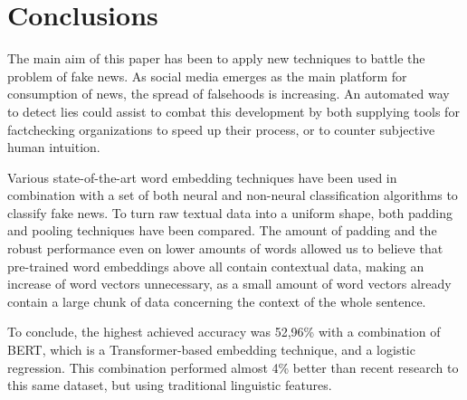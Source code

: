 \section{Conclusions}
The main aim of this paper has been to apply new techniques to battle the problem of fake news.
As social media emerges as the main platform for consumption of news, the spread of falsehoods is increasing. 
An automated way to detect lies could assist to combat this development by both supplying tools for factchecking organizations to speed up their process, or to counter subjective human intuition.

Various state-of-the-art word embedding techniques have been used in combination with a set of both neural and non-neural classification algorithms to classify fake news.
To turn raw textual data into a uniform shape, both padding and pooling techniques have been compared. 
The amount of padding and the robust performance even on lower amounts of words allowed us to believe that pre-trained word embeddings above all contain contextual data, making an increase of word vectors unnecessary, as a small amount of word vectors already contain a large chunk of data concerning the context of the whole sentence. 

To conclude, the highest achieved accuracy was 52,96\% with a combination of BERT, which is a Transformer-based embedding technique, and a logistic regression.
This combination performed almost 4\% better than recent research to this same dataset, but using traditional linguistic features. 